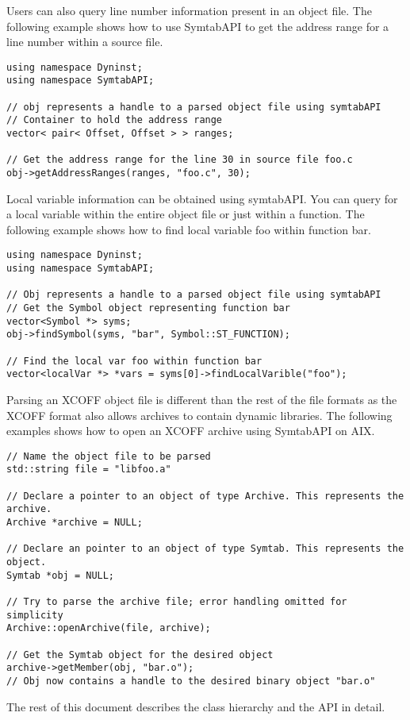 Users can also query line number information present in an object file. The following example shows how to use SymtabAPI to get the address range for a line number within a source file.

\begin{lstlisting}
using namespace Dyninst;
using namespace SymtabAPI;

// obj represents a handle to a parsed object file using symtabAPI
// Container to hold the address range
vector< pair< Offset, Offset > > ranges;

// Get the address range for the line 30 in source file foo.c
obj->getAddressRanges(ranges, "foo.c", 30);
\end{lstlisting}

Local variable information can be obtained using symtabAPI. You can query for a local variable within the entire object file or just within a function. The following example shows how to find local variable foo within function bar.

\begin{lstlisting}
using namespace Dyninst;
using namespace SymtabAPI;

// Obj represents a handle to a parsed object file using symtabAPI
// Get the Symbol object representing function bar
vector<Symbol *> syms;
obj->findSymbol(syms, "bar", Symbol::ST_FUNCTION);

// Find the local var foo within function bar
vector<localVar *> *vars = syms[0]->findLocalVarible("foo");
\end{lstlisting}

Parsing an XCOFF object file is different than the rest of the file formats as the XCOFF format also allows archives to contain dynamic libraries. The following examples shows how to open an XCOFF archive using SymtabAPI on AIX.

\begin{lstlisting}
// Name the object file to be parsed
std::string file = "libfoo.a"

// Declare a pointer to an object of type Archive. This represents the archive.
Archive *archive = NULL;

// Declare an pointer to an object of type Symtab. This represents the object.
Symtab *obj = NULL;

// Try to parse the archive file; error handling omitted for simplicity
Archive::openArchive(file, archive);

// Get the Symtab object for the desired object
archive->getMember(obj, "bar.o");
// Obj now contains a handle to the desired binary object "bar.o"
\end{lstlisting}

The rest of this document describes the class hierarchy and the API in detail.
